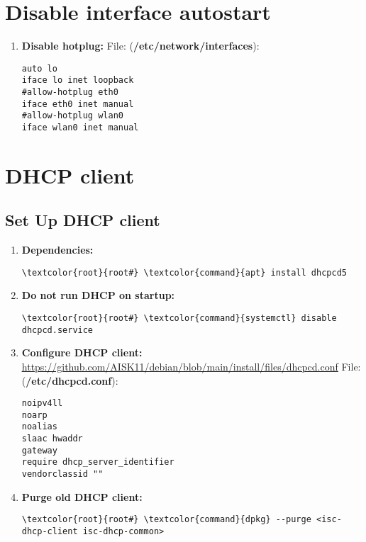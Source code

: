 \documentclass[10pt, a4paper, onecolumn, openany]{book} %
\begin{document}
\section{Disable interface autostart}
\begin{enumerate}
    \item \textbf{Disable hotplug:}
\newline File: (\textbf{\textcolor{file}{/etc/network/interfaces}}):
\begin{Verbatim}[commandchars=\\\{\}]
auto lo
iface lo inet loopback
#allow-hotplug eth0
iface eth0 inet manual
#allow-hotplug wlan0
iface wlan0 inet manual
\end{Verbatim}
\end{enumerate}
\section{DHCP client}
\subsection{Set Up DHCP client}
\begin{enumerate}
    \item \textbf{Dependencies:}
\begin{Verbatim}[commandchars=\\\{\}]
\textcolor{root}{root#} \textcolor{command}{apt} install dhcpcd5
\end{Verbatim}
    \item \textbf{Do not run DHCP on startup:}
\begin{Verbatim}[commandchars=\\\{\}]
\textcolor{root}{root#} \textcolor{command}{systemctl} disable dhcpcd.service
\end{Verbatim}
    \item \textbf{Configure DHCP client:}
\newline \underline{\url{https://github.com/AISK11/debian/blob/main/install/files/dhcpcd.conf}}
\newline File: (\textbf{\textcolor{file}{/etc/dhcpcd.conf}}):
\begin{Verbatim}[commandchars=\\\{\}]
noipv4ll
noarp
noalias
slaac hwaddr
gateway
require dhcp_server_identifier
vendorclassid ""
\end{Verbatim}
    \item \textbf{Purge old DHCP client:}
\begin{Verbatim}[commandchars=\\\{\}]
\textcolor{root}{root#} \textcolor{command}{dpkg} --purge <isc-dhcp-client isc-dhcp-common>
\end{Verbatim}
\end{enumerate}
\end{document}
